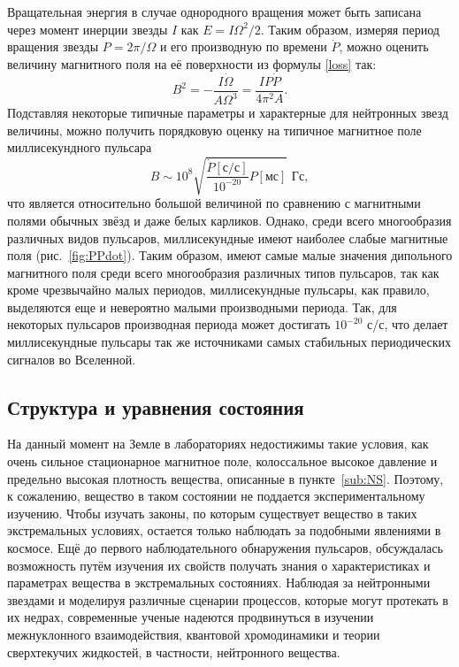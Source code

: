\documentclass[14pt,a4paper]{extarticle}
\newcommand{\be}{\begin{equation}}
\newcommand{\ee}{\end{equation}}
\begin{document}
			Вращательная энергия в случае однородного вращения может быть записана через момент инерции звезды $I$ как $E = I\Omega^2 /2 $.
			Таким образом, измеряя период вращения звезды $P=2\pi/\Omega$ и его производную по времени $\dot{P}$, можно оценить величину магнитного поля на её поверхности из формулы \eqref{loss} так:
			\begin{equation}\label{eq:BPPdot}
				B^2=-\frac{I\dot{\Omega}}{A\Omega^3}=\frac{IP\dot{P}}{4\pi^2A}.
			\end{equation}
			Подставляя некоторые типичные параметры и характерные для нейтронных звезд величины, можно получить порядковую оценку на типичное магнитное поле миллисекундного пульсара \be
			B\sim  10^{8} \sqrt{ \frac{\dot{P}[\text{с/с}]}{10^{-20}} P[\text {мс}]} \text{ Гс},
			\ee 
			что является относительно большой величиной по сравнению с магнитными полями обычных звёзд и даже белых карликов. 
			Однако, среди всего многообразия различных видов пульсаров, миллисекундные имеют наиболее слабые магнитные поля (рис.~\ref{fig:PPdot}).  
			Таким образом, имеют самые малые значения дипольного магнитного поля среди всего многообразия различных типов пульсаров, так как кроме чрезвычайно малых периодов, миллисекундные пульсары, как правило, выделяются еще и невероятно малыми производными периода. 
			Так, для некоторых пульсаров производная периода может достигать $10^{-20}$ с/с, что делает миллисекундные пульсары  так же источниками самых стабильных периодических сигналов во  Вселенной.  



		\subsection{Структура и уравнения состояния} %
		\label{sub:EOS}
			На данный момент на Земле в лабораториях недостижимы такие условия, как
			очень сильное стационарное магнитное поле, колоссальное высокое давление и предельно высокая плотность вещества, 
			описанные в пункте~\ref{sub:NS}.
			Поэтому, к сожалению, вещество в таком состоянии не поддается экспериментальному изучению. 
			Чтобы изучать законы, по которым существует вещество в таких экстремальных условиях, остается только наблюдать за подобными явлениями в космосе.
			Ещё до первого наблюдательного обнаружения пульсаров, обсуждалась \cite{Oppenheimer1939} возможность путём изучения их свойств получать знания о характеристиках и параметрах вещества в экстремальных состояниях.
			Наблюдая за нейтронными звездами и моделируя различные сценарии процессов, которые могут протекать в их недрах, 
			современные ученые надеются продвинуться в изучении межнуклонного взаимодействия, квантовой хромодинамики и теории сверхтекучих жидкостей, в частности, нейтронного вещества.
\end{document}
